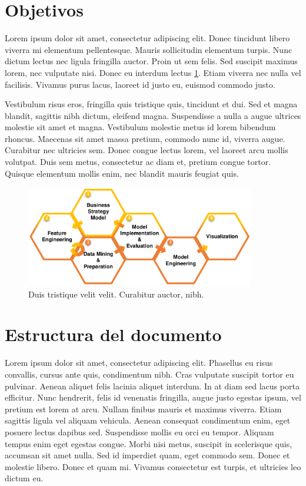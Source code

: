 \section{Objetivos}\label{sec:objetivos}
Lorem ipsum dolor sit amet, consectetur adipiscing elit. Donec tincidunt libero viverra mi elementum pellentesque. Mauris sollicitudin elementum turpis. Nunc dictum lectus nec ligula fringilla auctor. Proin ut sem felis. Sed suscipit maximus lorem, nec vulputate nisi. Donec eu interdum lectus \ref{fig:figure1}. Etiam viverra nec nulla vel facilisis. Vivamus purus lacus, laoreet id justo eu, euismod commodo justo.\par

Vestibulum risus eros, fringilla quis tristique quis, tincidunt et dui. Sed et magna blandit, sagittis nibh dictum, eleifend magna. Suspendisse a nulla a augue ultrices molestie sit amet et magna. Vestibulum molestie metus id lorem bibendum rhoncus. Maecenas sit amet massa pretium, commodo nunc id, viverra augue. Curabitur nec ultricies sem. Donec congue lectus lorem, vel laoreet arcu mollis volutpat. Duis sem metus, consectetur ac diam et, pretium congue tortor. Quisque elementum mollis enim, nec blandit mauris feugiat quis.\par

\begin{figure}[h]
    \centering
    \captionsetup{width=10cm}
    \includegraphics[width=10cm]{contenido/fig/DDSD.pdf}
    \caption{Duis tristique velit velit. Curabitur auctor, nibh.}
    \label{fig:figure1}
\end{figure}

\section{Estructura del documento}\label{sec:estructura}
Lorem ipsum dolor sit amet, consectetur adipiscing elit. Phasellus eu risus convallis, cursus ante quis, condimentum nibh. Cras vulputate suscipit tortor eu pulvinar. Aenean aliquet felis lacinia aliquet interdum. In at diam sed lacus porta efficitur. Nunc hendrerit, felis id venenatis fringilla, augue justo egestas ipsum, vel pretium est lorem at arcu. Nullam finibus mauris et maximus viverra. Etiam sagittis ligula vel aliquam vehicula. Aenean consequat condimentum enim, eget posuere lectus dapibus sed. Suspendisse mollis eu orci eu tempor. Aliquam tempus enim eget egestas congue. Morbi nisi metus, suscipit in scelerisque quis, accumsan sit amet nulla. Sed id imperdiet quam, eget commodo sem. Donec et molestie libero. Donec et quam mi. Vivamus consectetur est turpis, et ultricies leo dictum eu.\par

